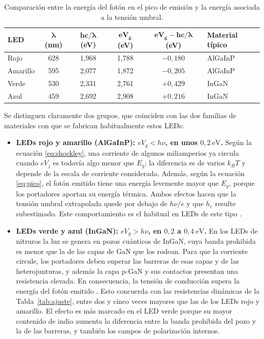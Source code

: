 \documentclass{article}
\begin{document}
\begin{table}[H]
\centering\small
\caption{Comparación entre la energía del fotón en el pico de emisión y la energía asociada a la tensión umbral.}
\label{tab:energias}
\begin{tabular}{@{}lccccl@{}}
\toprule
\textbf{LED} & $\boldsymbol{\lambda}$ \textbf{(nm)} & $\boldsymbol{hc/\lambda}$ \textbf{(eV)} & $\boldsymbol{eV_g}$ \textbf{(eV)} & $\boldsymbol{eV_g-hc/\lambda}$ \textbf{(eV)} & \textbf{Material típico}\\
\midrule
Rojo     & 628 & 1,968 & 1,788 & $-0,180$ & AlGaInP\\
Amarillo & 595 & 2,077 & 1,872 & $-0,205$ & AlGaInP\\
Verde    & 530 & 2,331 & 2,761 & $+0,429$ & InGaN\\
Azul     & 459 & 2,692 & 2,908 & $+0,216$ & InGaN\\
\bottomrule
\end{tabular}
\end{table}

Se distinguen claramente dos grupos, que coinciden con las dos familias de materiales con que se fabrican habitualmente estos LEDs:

\begin{itemize}
    \item \textbf{LEDs rojo y amarillo (AlGaInP): $eV_g<h\nu$, en unos $0,2\ \mathrm{eV}$.} Según la ecuación \eqref{eq:shockley}, una corriente de algunos miliamperios ya circula cuando $eV_j$ es todavía algo menor que $E_g$: la diferencia es de varios $k_BT$ y depende de la escala de corriente considerada. Además, según la ecuación \eqref{eq:pico}, el fotón emitido tiene una energía levemente mayor que $E_g$, porque los portadores aportan su energía térmica. Ambos efectos hacen que la tensión umbral extrapolada quede por debajo de $h\nu/e$ y que $h_e$ resulte subestimado. Este comportamiento es el habitual en LEDs de este tipo \cite{schubert}.
    \item \textbf{LEDs verde y azul (InGaN): $eV_g>h\nu$, en $0,2$ a $0,4\ \mathrm{eV}$.} En los LEDs de nitruros la luz se genera en pozos cuánticos de InGaN, cuya banda prohibida es menor que la de las capas de GaN que los rodean. Para que la corriente circule, los portadores deben superar las barreras de esas capas y de las heterojunturas, y además la capa p-GaN y sus contactos presentan una resistencia elevada. En consecuencia, la tensión de conducción supera la energía del fotón emitido \cite{schubert}. Esto concuerda con las resistencias dinámicas de la Tabla~\ref{tab:ajuste}, entre dos y cinco veces mayores que las de los LEDs rojo y amarillo. El efecto es más marcado en el LED verde porque su mayor contenido de indio aumenta la diferencia entre la banda prohibida del pozo y la de las barreras, y también los campos de polarización internos.
\end{itemize}
\end{document}
